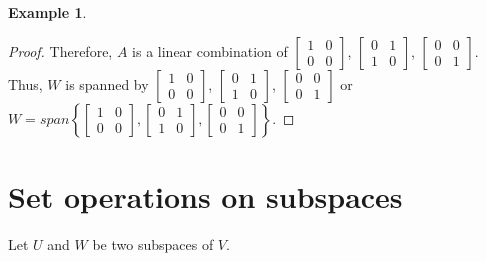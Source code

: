 \documentclass[12pt]{article}
\theoremstyle{definition}
\newtheorem*{example}{Example}
\begin{document}
\begin{example}
\begin{proof}
Therefore, $A$ is a linear combination of $\begin{bmatrix} 1 & 0 \\ 0 & 0 \end{bmatrix}$,
$\begin{bmatrix} 0 & 1 \\ 1 & 0 \end{bmatrix}$, $\begin{bmatrix} 0 & 0 \\ 0 & 1 \end{bmatrix}$.
Thus, $W$ is spanned by $\begin{bmatrix} 1 & 0 \\ 0 & 0 \end{bmatrix}$,
$\begin{bmatrix} 0 & 1 \\ 1 & 0 \end{bmatrix}$, $\begin{bmatrix} 0 & 0 \\ 0 & 1 \end{bmatrix}$
or $W = span\left\{ \begin{bmatrix} 1 & 0 \\ 0 & 0 \end{bmatrix},
\begin{bmatrix} 0 & 1 \\ 1 & 0 \end{bmatrix}, \begin{bmatrix} 0 & 0 \\ 0 & 1 \end{bmatrix}
\right\}$.
\end{proof}

\end{example}

\section{Set operations on subspaces}

Let $U$ and $W$ be two subspaces of $V$.
\end{document}
